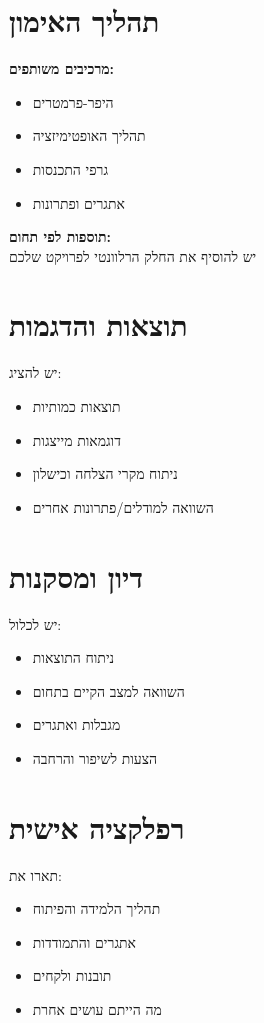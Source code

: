 \documentclass[11pt]{article}
\begin{document}
\section{תהליך האימון}
\begin{fillbox}
\textbf{מרכיבים משותפים:}
\begin{itemize}
  \item היפר-פרמטרים
  \item תהליך האופטימיזציה
  \item גרפי התכנסות
  \item אתגרים ופתרונות
\end{itemize}

\textbf{תוספות לפי תחום:}\\
יש להוסיף את החלק הרלוונטי לפרויקט שלכם
\end{fillbox}

\section{תוצאות והדגמות}
\begin{fillbox}
יש להציג:
\begin{itemize}
  \item תוצאות כמותיות
  \item דוגמאות מייצגות
  \item ניתוח מקרי הצלחה וכישלון
  \item השוואה למודלים/פתרונות אחרים
\end{itemize}
\end{fillbox}

\section{דיון ומסקנות}
\begin{fillbox}
יש לכלול:
\begin{itemize}
  \item ניתוח התוצאות
  \item השוואה למצב הקיים בתחום
  \item מגבלות ואתגרים
  \item הצעות לשיפור והרחבה
\end{itemize}
\end{fillbox}

\section{רפלקציה אישית}
\begin{fillbox}
תארו את:
\begin{itemize}
  \item תהליך הלמידה והפיתוח
  \item אתגרים והתמודדות
  \item תובנות ולקחים
  \item מה הייתם עושים אחרת
\end{itemize}
\end{fillbox}
\end{document}
